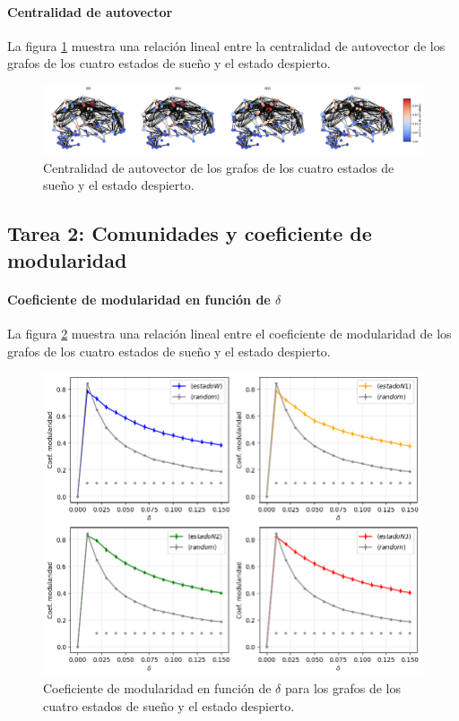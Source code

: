 \documentclass{article}
\begin{document}
\paragraph*{Centralidad de autovector}

La figura \ref{fg:centralidadAutovector} muestra una relación lineal entre la centralidad de autovector de los grafos de los cuatro estados de sueño y el estado despierto.

\begin{figure}[ht]
	\centering
	\includegraphics[width= \linewidth]{centralidadDensidadCeroPuntoDoce.png}
	\caption{Centralidad de autovector de los grafos de los cuatro estados de sueño y el estado despierto.
	}
	\label{fg:centralidadAutovector}
\end{figure}


\subsection{Tarea 2: Comunidades y coeficiente de modularidad}

\paragraph*{Coeficiente de modularidad en función de $\delta$}

La figura \ref{fg:coeficienteModularidad} muestra una relación lineal entre el coeficiente de modularidad de los grafos de los cuatro estados de sueño y el estado despierto.

\begin{figure}[ht]
	\centering
	\includegraphics[width= 0.8\linewidth]{coeficienteModularidad.png}
	\caption{Coeficiente de modularidad en función de $\delta$ para los grafos de los cuatro estados de sueño y el estado despierto.
	}
	\label{fg:coeficienteModularidad}
\end{figure}
\end{document}
